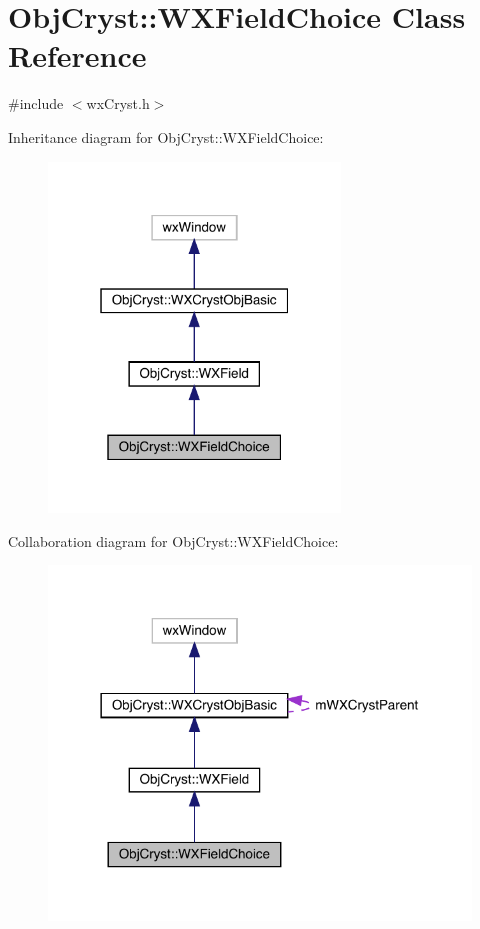 \hypertarget{class_obj_cryst_1_1_w_x_field_choice}{}\section{Obj\+Cryst\+::W\+X\+Field\+Choice Class Reference}
\label{class_obj_cryst_1_1_w_x_field_choice}


{\ttfamily \#include $<$wx\+Cryst.\+h$>$}



Inheritance diagram for Obj\+Cryst\+::W\+X\+Field\+Choice\+:
\nopagebreak
\begin{figure}[H]
\begin{center}
\leavevmode
\includegraphics[width=220pt]{class_obj_cryst_1_1_w_x_field_choice__inherit__graph}
\end{center}
\end{figure}


Collaboration diagram for Obj\+Cryst\+::W\+X\+Field\+Choice\+:
\nopagebreak
\begin{figure}[H]
\begin{center}
\leavevmode
\includegraphics[width=318pt]{class_obj_cryst_1_1_w_x_field_choice__coll__graph}
\end{center}
\end{figure}

